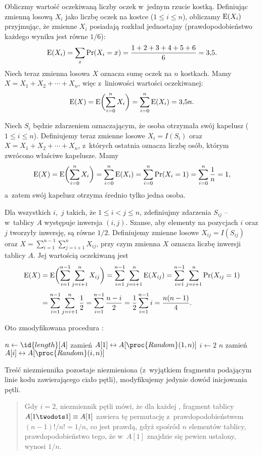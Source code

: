 \exercise %
Obliczmy wartość oczekiwaną liczby oczek w~jednym rzucie kostką. Definiując zmienną losową $X_i$ jako liczbę oczek na  kostce ($1\le i\le n$), obliczamy $\operatorname{E}(X_i)$ przyjmując, że zmienne $X_i$ posiadają rozkład jednostajny (prawdopodobieństwo każdego wyniku jest równe $1/6$):
\[
	\operatorname{E}(X_i) = \sum_x\Pr(X_i=x) = \frac{1+2+3+4+5+6}{6} = 3{,}5.
\]
Niech teraz zmienna losowa $X$ oznacza sumę oczek na $n$ kostkach. Mamy $X=X_1+X_2+\cdots+X_n$, więc z~liniowości wartości oczekiwanej:
\[
	\operatorname{E}(X) = \operatorname{E}\biggl(\sum_{i=0}^nX_i\biggr) = \sum_{i=0}^n\operatorname{E}(X_i) = 3{,}5n.
\]

\exercise %
Niech $S_i$ będzie zdarzeniem oznaczającym, że  osoba otrzymała swój kapelusz ($1\le i\le n$). Definiujemy teraz zmienne losowe $X_i=I(S_i)$ oraz $X=X_1+X_2+\cdots+X_n$, z~których ostatnia oznacza liczbę osób, którym zwrócono właściwe kapelusze. Mamy
\[
	\operatorname{E}(X) = \operatorname{E}\biggl(\sum_{i=0}^nX_i\biggr) = \sum_{i=0}^n\operatorname{E}(X_i) = \sum_{i=0}^n\Pr(X_i=1) = \sum_{i=0}^n\frac{1}{n} = 1,
\]
a~zatem swój kapelusz otrzyma średnio tylko jedna osoba.

\exercise %
Dla wszystkich $i$,~$j$ takich, że $1\le i<j\le n$, zdefiniujmy zdarzenia $S_{ij}$ -- w~tablicy $A$ występuje inwersja $(i,j)$. Szanse, aby elementy na pozycjach $i$ oraz $j$ tworzyły inwersję, są równe $1/2$. Definiujemy zmienne losowe $X_{ij}=I(S_{ij})$ oraz $X=\sum_{i=1}^{n-1}\sum_{j=i+1}^nX_{ij}$, przy czym zmienna $X$ oznacza liczbę inwersji tablicy $A$. Jej wartością oczekiwaną jest
\begin{align*}
	\operatorname{E}(X) &= \operatorname{E}\biggl(\sum_{i=1}^{n-1}\sum_{j=i+1}^nX_{ij}\biggr) = \sum_{i=1}^{n-1}\sum_{j=i+1}^n\operatorname{E}(X_{ij}) = \sum_{i=1}^{n-1}\sum_{j=i+1}^n\Pr(X_{ij}=1) \\[1mm]
	&= \sum_{i=1}^{n-1}\sum_{j=i+1}^n\frac{1}{2} = \sum_{i=1}^{n-1}\frac{n-i}{2} = \frac{1}{2}\sum_{i=1}^{n-1}i = \frac{n(n-1)}{4}.
\end{align*}


\exercise %
Oto zmodyfikowana procedura :
\begin{codebox}
\li	$n\gets\id{length}[A]$
\li	zamień $A[1]\leftrightarrow A[\proc{Random}(1,n)]$
\li	\For $i\gets2$ \To $n$
\li		\Do
			zamień $A[i]\leftrightarrow A[\proc{Random}(i,n)]$
		\End
\end{codebox}
Treść niezmiennika pozostaje niezmieniona (z~wyjątkiem fragmentu podającym linie kodu zawierającego ciało pętli), modyfikujemy jedynie dowód inicjowania pętli.
\begin{quote}
	Gdy $i=2$, niezmiennik pętli mówi, że dla każdej , fragment tablicy $A[1\twodots1]\equiv A[1]$ zawiera tę permutację z~prawdopodobieństwem $(n-1)!/n!=1/n$, co jest prawdą, gdyż spośród $n$ elementów tablicy, prawdopodobieństwo tego, że w~$A[1]$ znajdzie się pewien ustalony, wynosi $1/n$.
\end{quote}

